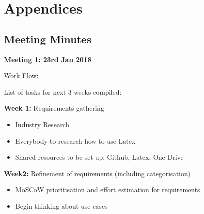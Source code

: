 \newpage

% 

\printbibliography


\newpage
\section{Appendices}

\subsection{Meeting Minutes}

\textbf{Meeting 1: 23rd Jan 2018}

Work Flow:

List of tasks for next 3 weeks compiled:

\textbf{Week 1:} Requirements gathering

\begin{itemize}
  \item Industry Research
  \item Everybody to research how to use Latex
  \item Shared resources to be set up: Github, Latex, One Drive

\end{itemize}


\textbf{Week2:} Refinement of requirements (including categorisation)

\begin{itemize}
  \item MoSCoW prioritisation and effort estimation for requirements
  \item Begin thinking about use cases


\end{itemize}


